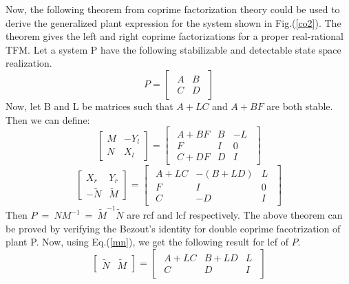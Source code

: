 \documentclass[a4paper,12pt]{article}
\begin{document}
	Now, the following theorem from coprime factorization theory could be used to derive the generalized plant expression for the system shown in Fig.(\ref{co2}).
	The theorem gives the left and right coprime factorizations for a proper real-rational TFM. Let a system P have the following stabilizable and detectable state space realization.
	\[P =
	\begin{bmatrix}
	\begin{array}{c|c}
	A & B \\ \hline
	C & D	
	\end{array}
	\end{bmatrix}
	\]
	Now, let B and L be matrices such that $A+LC$ and $A+BF$ are both stable. Then we can define:
	\begin{equation}
	\begin{bmatrix}
	M & -Y_{l} \\
	N & X_{l}
	\end{bmatrix}
	=
	\begin{bmatrix}
	\begin{array}{c|cc}
	A+BF & B & -L \\ \hline
	F & I & 0\\ 
	C+DF & D & I
	\end{array}
	\end{bmatrix}
	\end{equation}
	\begin{equation}
	\begin{bmatrix}
	X_{r} & Y_{r} \\
	-\tilde{N} & \tilde{M}
	\end{bmatrix}
	=
	\begin{bmatrix}
	\begin{array}{c|cc}
	A+LC & -(B+LD) & L \\ \hline
	F & I & 0\\ 
	C & -D & I
	\end{array}
	\end{bmatrix}
	\label{mn}
	\end{equation}
	Then $P\:=\:NM^{-1}\:=\:\tilde{M}^{-1}\tilde{N}$ are rcf and lcf respectively. The above theorem can be proved by verifying the Bezout's identity for double coprime  facotrization of plant P. Now, using Eq.(\ref{mn}), we get the following result for lcf of $P$.
	\begin{equation}
	\begin{bmatrix}
	\tilde{N} & \tilde{M}
	\end{bmatrix}
	= \begin{bmatrix}
	\begin{array}{c|cc}
	A+LC & B+LD & L \\ \hline C & D & I	
	\end{array}
	\end{bmatrix}
	\label{mn2}
	\end{equation}
\end{document}
